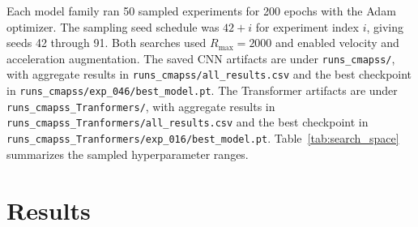 \documentclass[11pt,a4paper]{article}
\begin{document}
Each model family ran 50 sampled experiments for 200 epochs with the Adam optimizer. The sampling seed schedule was $42+i$ for experiment index $i$, giving seeds 42 through 91. Both searches used $R_{\max}=2000$ and enabled velocity and acceleration augmentation. The saved CNN artifacts are under \texttt{runs\_cmapss/}, with aggregate results in \texttt{runs\_cmapss/all\_results.csv} and the best checkpoint in \texttt{runs\_cmapss/exp\_046/best\_model.pt}. The Transformer artifacts are under \texttt{runs\_cmapss\_Tranformers/}, with aggregate results in \texttt{runs\_cmapss\_Tranformers/all\_results.csv} and the best checkpoint in \texttt{runs\_cmapss\_Tranformers/exp\_016/best\_model.pt}. Table~\ref{tab:search_space} summarizes the sampled hyperparameter ranges.

\begin{table}[htbp]
\centering
\caption{Hyperparameter search spaces used in the convolutional and Transformer notebooks.}
\label{tab:search_space}
\end{table}

\newpage


\section{Results}
\end{document}
